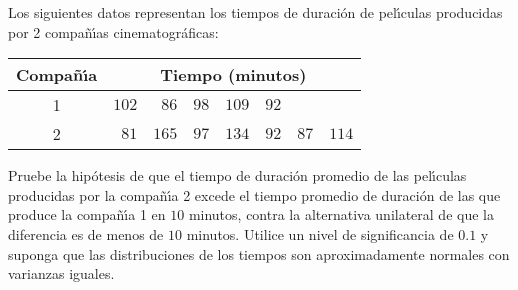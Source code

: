 \begin{enunciado}
 Los siguientes datos representan los tiempos de duraci\'on de pel\'{\i}culas producidas por 2 compa\~n\'{\i}as cinematogr\'aficas:
 \begin{center}
  \begin{tabular}{crrrrrrr}
   \textbf{Compa\~n\'{\i}a} & \multicolumn{7}{c}{\textbf{Tiempo (minutos)}} \\
   \hline 
   1 & $102$ & $86$ & $98$ & $109$ & $92$ & & \\
   2 & $81$ & $165$ & $97$ & $134$ & $92$ & $87$ & $114$
  \end{tabular}
 \end{center}
 Pruebe la hip\'otesis de que el tiempo de duraci\'on promedio de las pel\'{\i}culas producidas por la compa\~n\'{\i}a 2 excede el tiempo promedio de duraci\'on de las que produce la compa\~n\'{\i}a 1 en $10$ minutos, contra la alternativa unilateral de que la diferencia es de menos de $10$ minutos. Utilice un nivel de significancia de $0.1$ y suponga que las distribuciones de los tiempos son aproximadamente normales con varianzas iguales.
\end{enunciado}

